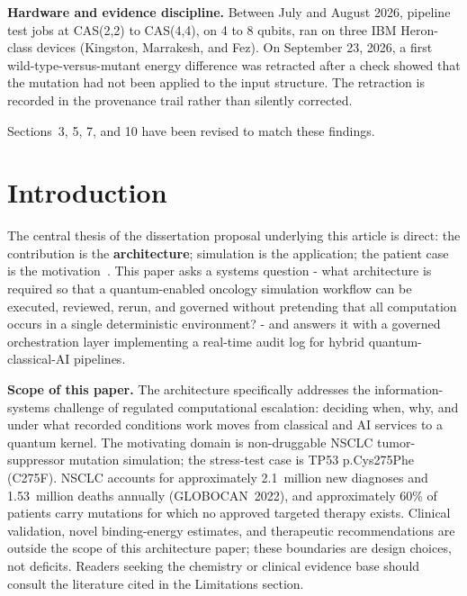 \documentclass[11pt,letterpaper]{article}
\begin{document}
\textbf{Hardware and evidence discipline.}  Between July and August 2026, pipeline test jobs
at CAS(2,2) to CAS(4,4), on 4 to 8 qubits, ran on three IBM Heron-class devices (Kingston,
Marrakesh, and Fez).  On September 23, 2026, a first wild-type-versus-mutant energy difference
was retracted after a check showed that the mutation had not been applied to the input
structure.  The retraction is recorded in the provenance trail rather than silently corrected.

Sections~3, 5, 7, and 10 have been revised to match these findings.

\section{Introduction}

The central thesis of the dissertation proposal underlying this article is direct: the
contribution is the \textbf{architecture}; simulation is the application; the patient case is
the motivation~\cite{cohen2026proposal}.  This paper asks a systems question - what
architecture is required so that a quantum-enabled oncology simulation workflow can be
executed, reviewed, rerun, and governed without pretending that all computation occurs in
a single deterministic environment? - and answers it with a governed orchestration layer
implementing a real-time audit log for hybrid quantum-classical-AI pipelines.

\textbf{Scope of this paper.}  The architecture specifically addresses the information-systems
challenge of regulated computational escalation: deciding when, why, and under what recorded
conditions work moves from classical and AI services to a quantum kernel.  The motivating domain
is non-druggable NSCLC tumor-suppressor mutation simulation; the stress-test case is
TP53 p.Cys275Phe (C275F).  NSCLC accounts for approximately 2.1~million new diagnoses and
1.53~million deaths annually (GLOBOCAN~2022), and approximately 60\% of patients carry
mutations for which no approved targeted therapy exists.  Clinical validation, novel
binding-energy estimates, and therapeutic recommendations are outside the scope of this
architecture paper; these boundaries are design choices, not deficits.  Readers seeking the
chemistry or clinical evidence base should consult the literature cited in the Limitations
section.
\end{document}
